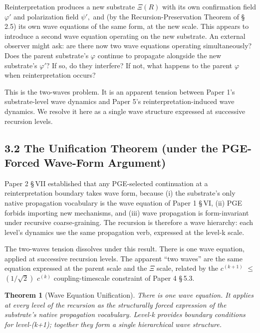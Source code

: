 \documentclass[11pt,oneside]{report}
\newtheorem{theorem}{Theorem}[section]
\theoremstyle{definition}
\theoremstyle{remark}
\begin{document}
Reinterpretation produces a new substrate \ensuremath{\Xi (R)} with its own confirmation
field \ensuremath{\varphi '} and polarization field \ensuremath{\psi ',} and (by the Recursion-Preservation
Theorem of \S\,2.5) its own wave equations of the same form, at the new
scale. This appears to introduce a second wave equation operating on the
new substrate. An external observer might ask: are there now two wave
equations operating simultaneously? Does the parent substrate's \ensuremath{\varphi}
continue to propagate alongside the new substrate's \ensuremath{\varphi '?} If so, do they
interfere? If not, what happens to the parent \ensuremath{\varphi} when reinterpretation
occurs?

This is the two-waves problem. It is an apparent tension between Paper
1's substrate-level wave dynamics and Paper 5's reinterpretation-induced
wave dynamics. We resolve it here as a single wave structure expressed
at successive recursion levels.

\subsection*{3.2 The Unification Theorem (under the PGE-Forced Wave-Form Argument)}

Paper 2 \S\,VII established that any PGE-selected continuation at a
reinterpretation boundary takes wave form, because (i) the substrate's
only native propagation vocabulary is the wave equation of Paper 1 \S\,VI,
(ii) PGE forbids importing new mechanisms, and (iii) wave propagation is
form-invariant under recursive coarse-graining. The recursion is
therefore a wave hierarchy: each level's dynamics use the same
propagation verb, expressed at the level-k scale.

The two-waves tension dissolves under this result. There is one wave
equation, applied at successive recursion levels. The apparent ``two
waves'' are the same equation expressed at the parent scale and the \ensuremath{\Xi}
scale, related by the \ensuremath{c^{(k+1)}} \ensuremath{\leq} \ensuremath{(1/\sqrt{2})} \ensuremath{c^{(k)}} coupling-timescale constraint
of Paper 4 \S\,5.3.

\begin{theorem}[Wave Equation Unification]
There is one wave
equation. It applies at every level of the recursion as the structurally
forced expression of the substrate's native propagation vocabulary.
Level-k provides boundary conditions for level-(k+1); together they form
a single hierarchical wave structure.
\end{theorem}
\end{document}
